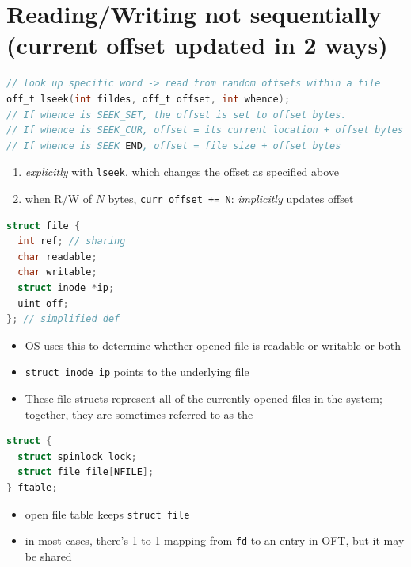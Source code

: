 \section*{Reading/Writing not sequentially (current offset updated in 2 ways)}
\begin{lstlisting}[language=c]
// look up specific word -> read from random offsets within a file
off_t lseek(int fildes, off_t offset, int whence);
// If whence is SEEK_SET, the offset is set to offset bytes.
// If whence is SEEK_CUR, offset = its current location + offset bytes
// If whence is SEEK_END, offset = file size + offset bytes
\end{lstlisting}
\begin{enumerate}
\item \emph{explicitly} with \texttt{lseek}, which changes the offset as specified above
\item when R/W of $N$ bytes, \texttt{curr\_offset += N}: \emph{implicitly} updates offset
\end{enumerate}
\begin{minipage}{.3\linewidth}
\begin{lstlisting}[language=c]
struct file {
  int ref; // sharing
  char readable;
  char writable;
  struct inode *ip;
  uint off;
}; // simplified def
\end{lstlisting}
\end{minipage}
\begin{minipage}{.7\linewidth}
  \flushleft
  \begin{itemize}
  \item OS uses this to determine whether opened file is readable or writable or both
  \item \texttt{struct inode ip} points to the underlying file
  \item These file structs represent all of the currently opened files in the system; together, they are sometimes referred to as the 
  \end{itemize}
\end{minipage}
\begin{minipage}{.45\linewidth}
\begin{lstlisting}[language=c]
struct {
  struct spinlock lock;
  struct file file[NFILE];
} ftable;
\end{lstlisting}
\end{minipage}
\begin{minipage}{.55\linewidth}
  \flushleft
  \begin{itemize}
  \item open file table keeps \texttt{struct file}
  \item in most cases, there's 1-to-1 mapping from \texttt{fd} to an entry in OFT, but it may be shared
  \end{itemize}
\end{minipage}
